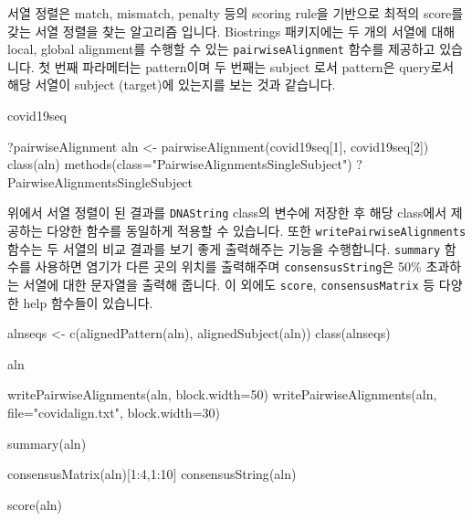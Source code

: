 \documentclass[
]{book}
\newenvironment{Shaded}{\begin{snugshade}}{\end{snugshade}}
\newcommand{\AttributeTok}[1]{\textcolor[rgb]{0.77,0.63,0.00}{#1}}
\newcommand{\DecValTok}[1]{\textcolor[rgb]{0.00,0.00,0.81}{#1}}
\newcommand{\FunctionTok}[1]{\textcolor[rgb]{0.00,0.00,0.00}{#1}}
\newcommand{\NormalTok}[1]{#1}
\newcommand{\OtherTok}[1]{\textcolor[rgb]{0.56,0.35,0.01}{#1}}
\newcommand{\SpecialCharTok}[1]{\textcolor[rgb]{0.00,0.00,0.00}{#1}}
\newcommand{\StringTok}[1]{\textcolor[rgb]{0.31,0.60,0.02}{#1}}
\begin{document}
서열 정렬은 match, mismatch, penalty 등의 scoring rule을 기반으로 최적의 score를 갖는 서열 정렬을 찾는 알고리즘 입니다. Biostrings 패키지에는 두 개의 서열에 대해 local, global alignment를 수행할 수 있는 \texttt{pairwiseAlignment} 함수를 제공하고 있습니다. 첫 번째 파라메터는 pattern이며 두 번째는 subject 로서 pattern은 query로서 해당 서열이 subject (target)에 있는지를 보는 것과 같습니다.

\begin{Shaded}
\begin{Highlighting}[]

\NormalTok{covid19seq}

\NormalTok{?pairwiseAlignment}
\NormalTok{aln }\OtherTok{\textless{}{-}} \FunctionTok{pairwiseAlignment}\NormalTok{(covid19seq[}\DecValTok{1}\NormalTok{], covid19seq[}\DecValTok{2}\NormalTok{])}
\FunctionTok{class}\NormalTok{(aln)}
\FunctionTok{methods}\NormalTok{(}\AttributeTok{class=}\StringTok{"PairwiseAlignmentsSingleSubject"}\NormalTok{)}
\NormalTok{?PairwiseAlignmentsSingleSubject}
\end{Highlighting}
\end{Shaded}

위에서 서열 정렬이 된 결과를 \texttt{DNAString} class의 변수에 저장한 후 해당 class에서 제공하는 다양한 함수를 동일하게 적용할 수 있습니다. 또한 \texttt{writePairwiseAlignments} 함수는 두 서열의 비교 결과를 보기 좋게 출력해주는 기능을 수행합니다. \texttt{summary} 함수를 사용하면 염기가 다른 곳의 위치를 출력해주며 \texttt{consensusString}은 50\% 초과하는 서열에 대한 문자열을 출력해 줍니다. 이 외에도 \texttt{score}, \texttt{consensusMatrix} 등 다양한 help 함수들이 있습니다.

\begin{Shaded}
\begin{Highlighting}[]
\NormalTok{alnseqs }\OtherTok{\textless{}{-}} \FunctionTok{c}\NormalTok{(}\FunctionTok{alignedPattern}\NormalTok{(aln), }\FunctionTok{alignedSubject}\NormalTok{(aln))}
\FunctionTok{class}\NormalTok{(alnseqs)}

\NormalTok{aln}

\FunctionTok{writePairwiseAlignments}\NormalTok{(aln, }\AttributeTok{block.width=}\DecValTok{50}\NormalTok{)}
\FunctionTok{writePairwiseAlignments}\NormalTok{(aln, }\AttributeTok{file=}\StringTok{"covidalign.txt"}\NormalTok{,  }\AttributeTok{block.width=}\DecValTok{30}\NormalTok{)}

\FunctionTok{summary}\NormalTok{(aln)}

\FunctionTok{consensusMatrix}\NormalTok{(aln)[}\DecValTok{1}\SpecialCharTok{:}\DecValTok{4}\NormalTok{,}\DecValTok{1}\SpecialCharTok{:}\DecValTok{10}\NormalTok{]}
\FunctionTok{consensusString}\NormalTok{(aln)}

\FunctionTok{score}\NormalTok{(aln)}
\end{Highlighting}
\end{Shaded}
\end{document}

